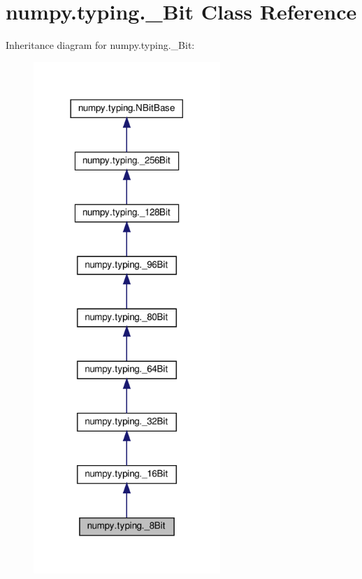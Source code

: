 \hypertarget{classnumpy_1_1typing_1_1__8Bit}{}\section{numpy.\+typing.\+\_\+Bit Class Reference}
\label{classnumpy_1_1typing_1_1__8Bit}


Inheritance diagram for numpy.\+typing.\+\_\+Bit\+:
\nopagebreak
\begin{figure}[H]
\begin{center}
\leavevmode
\includegraphics[width=200pt]{classnumpy_1_1typing_1_1__8Bit__inherit__graph}
\end{center}
\end{figure}


